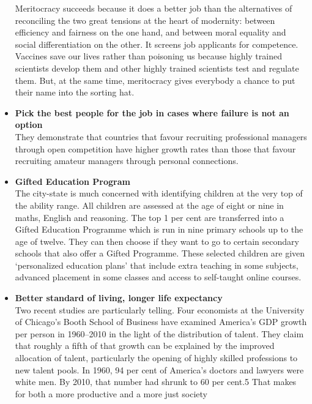 \documentclass[11pt]{article}
\begin{document}
\begin{itemize}
{                   Meritocracy succeeds because it does a better job than the alternatives of reconciling the two great tensions at the heart of modernity: between efficiency and fairness on the one hand, and between moral equality and social differentiation on the other. It screens job applicants for competence. Vaccines save our lives rather than poisoning us because highly trained scientists develop them and other highly trained scientists test and regulate them. But, at the same time, meritocracy gives everybody a chance to put their name into the sorting hat.
             }
       \item{
                   \textbf{Pick the best people for the job in cases where failure is not an option}
                   \\ They demonstrate that countries that favour recruiting professional managers through open competition have higher growth rates than those that favour recruiting amateur managers through personal connections.
             }
       \item{
                   \textbf{Gifted Education Program}
                   \\ The city-state is much concerned with identifying children at the very top of the ability range. All children are assessed at the age of eight or nine in maths, English and reasoning. The top 1 per cent are transferred into a Gifted Education Programme which is run in nine primary schools up to the age of twelve. They can then choose if they want to go to certain secondary schools that also offer a Gifted Programme. These selected children are given ‘personalized education plans’ that include extra teaching in some subjects, advanced placement in some classes and access to self-taught online courses.
             }
 \item {
       \textbf{Better standard of living, longer life expectancy}
       \\ Two recent studies are particularly telling. Four economists at the University of Chicago’s Booth School of Business have examined America’s GDP growth per person in 1960–2010 in the light of the distribution of talent. They claim that roughly a fifth of that growth can be explained by the improved allocation of talent, particularly the opening of highly skilled professions to new talent pools. In 1960, 94 per cent of America’s doctors and lawyers were white men. By 2010, that number had shrunk to 60 per cent.5 That makes for both a more productive and a more just society
       }
\end{itemize}
\end{document}
